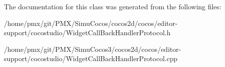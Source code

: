 The documentation for this class was generated from the following files\+:\begin{DoxyCompactItemize}
\item 
/home/pmx/git/\+P\+M\+X/\+Simu\+Cocos/cocos2d/cocos/editor-\/support/cocostudio/Widget\+Call\+Back\+Handler\+Protocol.\+h\item 
/home/pmx/git/\+P\+M\+X/\+Simu\+Cocos3/cocos2d/cocos/editor-\/support/cocostudio/Widget\+Call\+Back\+Handler\+Protocol.\+cpp\end{DoxyCompactItemize}
